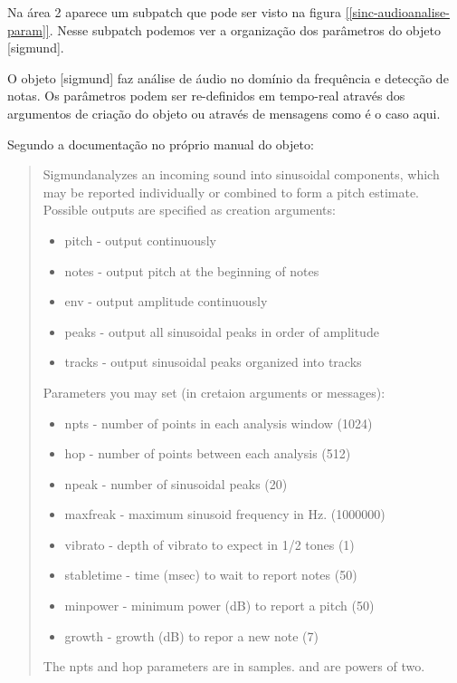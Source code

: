 \documentclass[draft]{ppgmus}
\begin{document}
Na área 2 aparece um subpatch que pode ser visto na figura
\ref{[sinc-audioanalise-param]}. Nesse subpatch podemos ver 
a organização dos parâmetros do objeto [sigmund\texttildelow].

O objeto [sigmund\texttildelow] faz análise de áudio no domínio da 
frequência e detecção de notas. Os parâmetros podem ser re-definidos
em tempo-real através dos argumentos de criação do objeto ou através
de mensagens como é o caso aqui.


Segundo a documentação no próprio manual do objeto:

\begin{quote}
 Sigmund\texttildelow analyzes an incoming sound into sinusoidal
components, which may be reported individually or combined to
form a pitch estimate. Possible outputs are specified as creation
arguments:

\begin{itemize}
 \item pitch - output continuously
 \item notes - output pitch at the beginning of notes
 \item env - output amplitude continuously
 \item peaks - output all sinusoidal peaks in order of amplitude
 \item tracks - output sinusoidal peaks organized into tracks
\end{itemize}
Parameters you may set (in cretaion arguments or messages):

\begin{itemize}
 \item npts - number of points in each analysis window (1024)
 \item hop - number of points between each analysis (512)
 \item npeak - number of sinusoidal peaks (20)
 \item maxfreak - maximum sinusoid frequency in Hz. (1000000)
 \item vibrato - depth of vibrato to expect in 1/2 tones (1)
 \item stabletime - time (msec) to wait to report notes (50)
 \item minpower - minimum power (dB) to report a pitch (50)
 \item growth - growth (dB) to repor a new note (7) 
\end{itemize}
The npts and hop parameters are in samples. and are powers of two.
\end{quote} 
\end{document}
